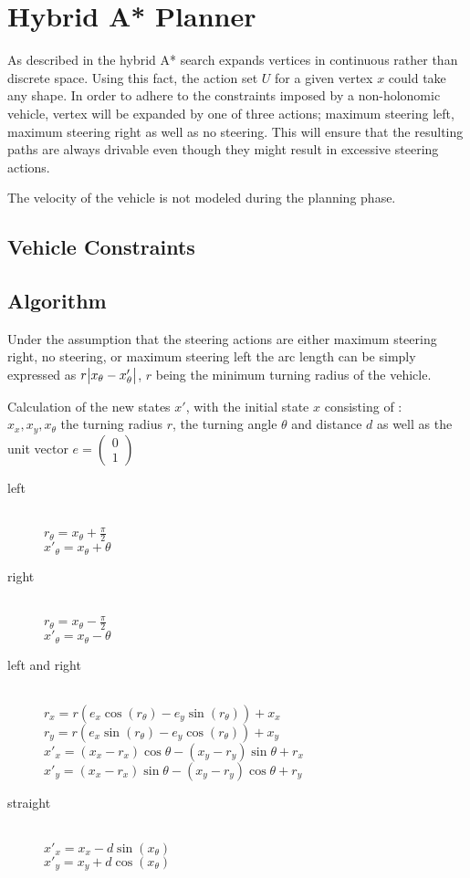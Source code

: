 \section{Hybrid A* Planner}
As described in  the hybrid A* search expands vertices in continuous rather than discrete space. Using this fact, the action set $U$ for a given vertex $x$ could take any shape. In order to adhere to the constraints imposed by a non-holonomic vehicle, vertex will be expanded by one of three actions; maximum steering left, maximum steering right as well as no steering. This will ensure that the resulting paths are always drivable even though they might result in excessive steering actions.

The velocity of the vehicle is not modeled during the planning phase.
\subsection{Vehicle Constraints}

\subsection{Algorithm}

Under the assumption that the steering actions are either maximum steering right, no steering, or maximum steering left the arc length can be simply expressed as $r\abs{x_\theta- x'_\theta}$, $r$ being the minimum turning radius of the vehicle. 

Calculation of the new states $x'$, with the initial state $x$ consisting of :\\
$x_x, x_y, x_\theta$ the turning radius $r$, the turning angle $\theta$ and distance $d$ as well as the unit vector $e = \left(\begin{smallmatrix}0\\1\end{smallmatrix}\right)$
\begin{description}
  \item[left] \hfill \\
  $r_\theta = x_\theta + \frac{\pi}{2}$\\
  $x'_\theta = x_\theta + \theta$
  \item[right] \hfill \\
  $r_\theta = x_\theta - \frac{\pi}{2}$\\
  $x'_\theta = x_\theta - \theta$
  \item[left and right] \hfill\\
  $r_x = r(e_x\cos(r_\theta) - e_y\sin(r_\theta)) + x_x$\\
  $r_y = r(e_x\sin(r_\theta) - e_y\cos(r_\theta)) + x_y$\\
  $x'_x = (x_x-r_x)\cos\theta - (x_y-r_y)\sin\theta + r_x$\\
  $x'_y = (x_x-r_x)\sin\theta - (x_y-r_y)\cos\theta + r_y$
  \item[straight] \hfill \\
  $x'_x = x_x - d\sin(x_\theta)$\\
  $x'_y = x_y + d\cos(x_\theta)$
\end{description}


